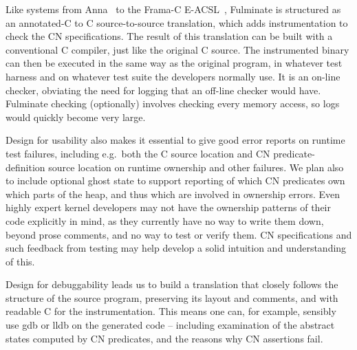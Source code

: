 \documentclass[withindex,glossary]{cam-thesis}
\newcommand\TODO[1]{}
\newcommand\TODO[1]{{\color{violet}TODO: #1}}
\begin{document}
{
Like systems from
Anna~\cite{DBLP:journals/software/LuckhamH85} to the Frama-C E-ACSL~\cite{DBLP:conf/sac/DelahayeKS13,DBLP:books/hal/Signoles18,DBLP:conf/issta/Signoles21}, Fulminate is structured as an annotated-C to C source-to-source translation, which adds instrumentation to check the CN specifications.  The result of this translation can be built with a conventional C compiler, just like the original C source. The instrumented binary can then be executed in the same way as the original program, in whatever test harness and on whatever test suite the developers normally use.
%
It is an on-line checker, obviating the need for logging that an off-line checker would have.  Fulminate checking (optionally) %
 involves checking every memory access, so logs would quickly become very large. 


Design for usability also makes it essential to give good error reports on runtime test failures,
including e.g.\ both the C source location and CN predicate-definition source location
on runtime ownership and other failures.  
We plan also to include optional ghost state to support reporting of which CN predicates own which parts of the heap, and thus which are involved in ownership errors.
Even highly expert kernel developers may not have the ownership patterns of their code explicitly in mind, as they currently have no way to write them down, beyond prose comments, and no way to test or verify them.  CN specifications and such feedback from testing may help develop a solid intuition and understanding of this.
%

Design for debuggability leads us to build a translation that closely follows the structure of the source program, preserving its layout and comments, and with readable C for the instrumentation. This means one can, for example, sensibly use gdb or lldb on the generated code -- including examination of the abstract states computed by CN predicates, and the reasons why CN assertions fail.

}
\end{document}
